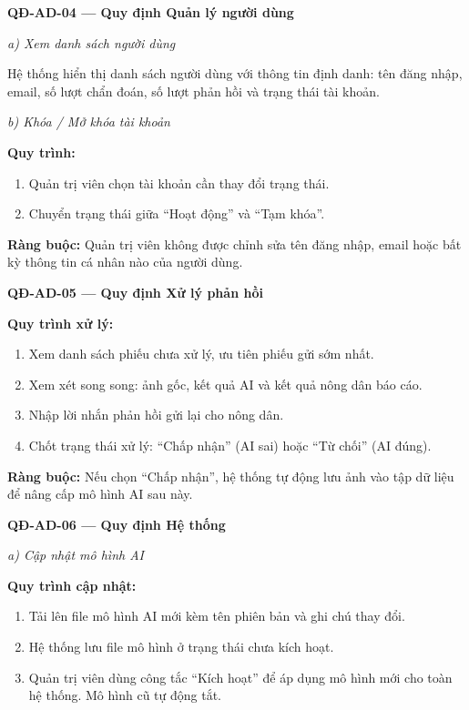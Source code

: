 \documentclass[12pt,a4paper]{article}
\begin{document}
\vspace{0.3cm}
\noindent\textbf{QĐ-AD-04 --- Quy định Quản lý người dùng}

\noindent\textit{a) Xem danh sách người dùng}

Hệ thống hiển thị danh sách người dùng với thông tin định danh: tên đăng nhập, email, số lượt chẩn đoán, số lượt phản hồi và trạng thái tài khoản.

\noindent\textit{b) Khóa / Mở khóa tài khoản}

\noindent\textbf{Quy trình:}
\begin{enumerate}
    \item Quản trị viên chọn tài khoản cần thay đổi trạng thái.
    \item Chuyển trạng thái giữa ``Hoạt động'' và ``Tạm khóa''.
\end{enumerate}
\noindent\textbf{Ràng buộc:} Quản trị viên không được chỉnh sửa tên đăng nhập, email hoặc bất kỳ thông tin cá nhân nào của người dùng.

\vspace{0.3cm}
\noindent\textbf{QĐ-AD-05 --- Quy định Xử lý phản hồi}

\noindent\textbf{Quy trình xử lý:}
\begin{enumerate}
    \item Xem danh sách phiếu chưa xử lý, ưu tiên phiếu gửi sớm nhất.
    \item Xem xét song song: ảnh gốc, kết quả AI và kết quả nông dân báo cáo.
    \item Nhập lời nhắn phản hồi gửi lại cho nông dân.
    \item Chốt trạng thái xử lý: ``Chấp nhận'' (AI sai) hoặc ``Từ chối'' (AI đúng).
\end{enumerate}
\noindent\textbf{Ràng buộc:} Nếu chọn ``Chấp nhận'', hệ thống tự động lưu ảnh vào tập dữ liệu để nâng cấp mô hình AI sau này.

\vspace{0.3cm}
\noindent\textbf{QĐ-AD-06 --- Quy định Hệ thống}

\noindent\textit{a) Cập nhật mô hình AI}

\noindent\textbf{Quy trình cập nhật:}
\begin{enumerate}
    \item Tải lên file mô hình AI mới kèm tên phiên bản và ghi chú thay đổi.
    \item Hệ thống lưu file mô hình ở trạng thái chưa kích hoạt.
    \item Quản trị viên dùng công tắc ``Kích hoạt'' để áp dụng mô hình mới cho toàn hệ thống. Mô hình cũ tự động tắt.
\end{enumerate}
\end{document}
